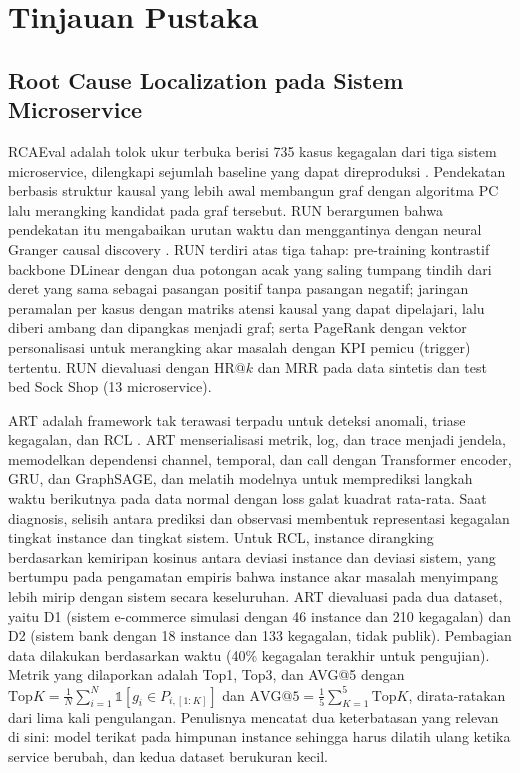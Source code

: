\section{Tinjauan Pustaka}\label{sec:related}
\subsection{Root Cause Localization pada Sistem Microservice}
RCAEval adalah tolok ukur terbuka berisi 735 kasus kegagalan dari tiga sistem microservice, dilengkapi sejumlah baseline yang dapat direproduksi \cite{pham2024rcaeval}. Pendekatan berbasis struktur kausal yang lebih awal membangun graf dengan algoritma PC lalu merangking kandidat pada graf tersebut. RUN berargumen bahwa pendekatan itu mengabaikan urutan waktu dan menggantinya dengan neural Granger causal discovery \cite{lin2024run}. RUN terdiri atas tiga tahap: pre-training kontrastif backbone DLinear dengan dua potongan acak yang saling tumpang tindih dari deret yang sama sebagai pasangan positif tanpa pasangan negatif; jaringan peramalan per kasus dengan matriks atensi kausal yang dapat dipelajari, lalu diberi ambang dan dipangkas menjadi graf; serta PageRank dengan vektor personalisasi untuk merangking akar masalah dengan KPI pemicu (trigger) tertentu. RUN dievaluasi dengan HR@$k$ dan MRR pada data sintetis dan test bed Sock Shop (13 microservice).

ART adalah framework tak terawasi terpadu untuk deteksi anomali, triase kegagalan, dan RCL \cite{sun2024art}. ART menserialisasi metrik, log, dan trace menjadi jendela, memodelkan dependensi channel, temporal, dan call dengan Transformer encoder, GRU, dan GraphSAGE, dan melatih modelnya untuk memprediksi langkah waktu berikutnya pada data normal dengan loss galat kuadrat rata-rata. Saat diagnosis, selisih antara prediksi dan observasi membentuk representasi kegagalan tingkat instance dan tingkat sistem. Untuk RCL, instance dirangking berdasarkan kemiripan kosinus antara deviasi instance dan deviasi sistem, yang bertumpu pada pengamatan empiris bahwa instance akar masalah menyimpang lebih mirip dengan sistem secara keseluruhan. ART dievaluasi pada dua dataset, yaitu D1 (sistem e-commerce simulasi dengan 46 instance dan 210 kegagalan) dan D2 (sistem bank dengan 18 instance dan 133 kegagalan, tidak publik). Pembagian data dilakukan berdasarkan waktu (40\% kegagalan terakhir untuk pengujian). Metrik yang dilaporkan adalah Top1, Top3, dan AVG@5 dengan
$\mathrm{Top}K=\frac{1}{N}\sum_{i=1}^{N}\mathbb{1}[g_i\in P_{i,[1:K]}]$ dan $\mathrm{AVG@5}=\frac{1}{5}\sum_{K=1}^{5}\mathrm{Top}K$, dirata-ratakan dari lima kali pengulangan. Penulisnya mencatat dua keterbatasan yang relevan di sini: model terikat pada himpunan instance sehingga harus dilatih ulang ketika service berubah, dan kedua dataset berukuran kecil.

